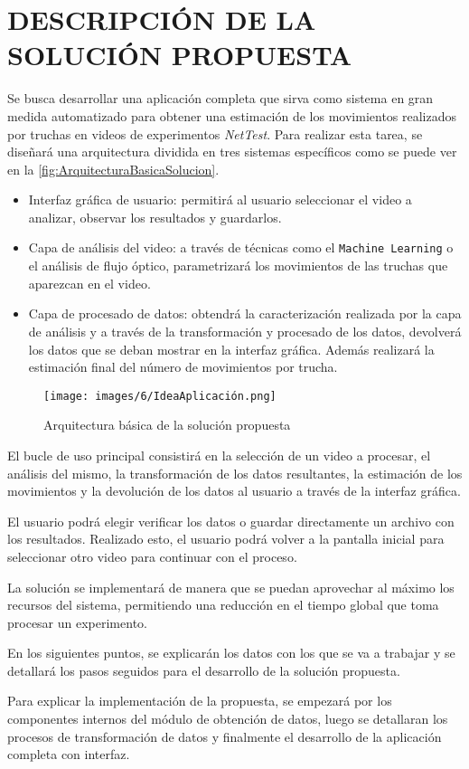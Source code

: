 \section{DESCRIPCIÓN DE LA SOLUCIÓN PROPUESTA}
Se busca desarrollar una aplicación completa que sirva como sistema en gran medida automatizado para obtener una estimación 
de los movimientos realizados por truchas en videos de experimentos \textit{NetTest}. Para realizar esta tarea, se diseñará 
una arquitectura dividida en tres sistemas específicos como se puede ver en la \autoref{fig:ArquitecturaBasicaSolucion}.

\begin{itemize}
    \item Interfaz gráfica de usuario: permitirá al usuario seleccionar el video a analizar, observar los resultados y guardarlos.
    \item Capa de análisis del video: a través de técnicas como el \texttt{Machine Learning} o el análisis de flujo óptico, parametrizará 
    los movimientos de las truchas que aparezcan en el video.
    \item Capa de procesado de datos: obtendrá la caracterización realizada por la capa de análisis y a través de la transformación y 
    procesado de los datos, devolverá los datos que se deban mostrar en la interfaz gráfica. Además realizará la estimación final del número 
    de movimientos por trucha.
\end{itemize}
\begin{figure}[H]
    \centering
    \texttt{[image: images/6/IdeaAplicación.png]}
    \caption{Arquitectura básica de la solución propuesta}
    \label{fig:ArquitecturaBasicaSolucion}
\end{figure}

El bucle de uso principal consistirá en la selección de un video a procesar, el análisis del mismo, la transformación de los datos resultantes, 
la estimación de los movimientos y la devolución de los datos al usuario a través de la interfaz gráfica.

El usuario podrá elegir verificar los datos o guardar directamente un archivo con los resultados. Realizado esto, el usuario podrá volver a la 
pantalla inicial para seleccionar otro video para continuar con el proceso.

La solución se implementará de manera que se puedan aprovechar al máximo los recursos del sistema, permitiendo una reducción en el tiempo global 
que toma procesar un experimento.

En los siguientes puntos, se explicarán los datos con los que se va a trabajar y se detallará los pasos seguidos para el desarrollo de la solución propuesta.

Para explicar la implementación de la propuesta, se empezará por los componentes internos del módulo de obtención de datos, luego se detallaran 
los procesos de transformación de datos y finalmente el desarrollo de la aplicación completa con interfaz.


\clearpage

